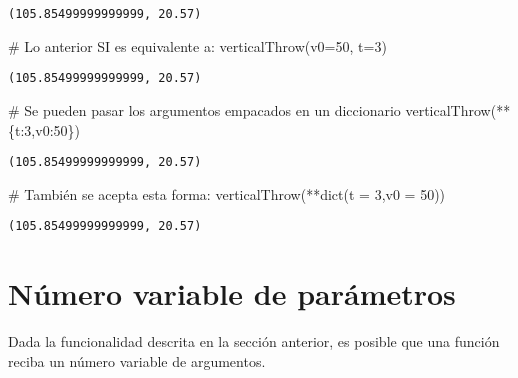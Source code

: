 \documentclass[
  letterpaper,
  DIV=11,
  numbers=noendperiod]{scrreprt}
\newenvironment{Shaded}{\begin{snugshade}}{\end{snugshade}}
\newcommand{\BuiltInTok}[1]{\textcolor[rgb]{0.00,0.23,0.31}{#1}}
\newcommand{\CommentTok}[1]{\textcolor[rgb]{0.37,0.37,0.37}{#1}}
\newcommand{\DecValTok}[1]{\textcolor[rgb]{0.68,0.00,0.00}{#1}}
\newcommand{\NormalTok}[1]{\textcolor[rgb]{0.00,0.23,0.31}{#1}}
\newcommand{\OperatorTok}[1]{\textcolor[rgb]{0.37,0.37,0.37}{#1}}
\newcommand{\StringTok}[1]{\textcolor[rgb]{0.13,0.47,0.30}{#1}}
\begin{document}
\begin{verbatim}
(105.85499999999999, 20.57)
\end{verbatim}

\begin{Shaded}
\begin{Highlighting}[]
\CommentTok{\# Lo anterior SI es equivalente a:}
\NormalTok{verticalThrow(v0}\OperatorTok{=}\DecValTok{50}\NormalTok{, t}\OperatorTok{=}\DecValTok{3}\NormalTok{)}
\end{Highlighting}
\end{Shaded}

\begin{verbatim}
(105.85499999999999, 20.57)
\end{verbatim}

\begin{Shaded}
\begin{Highlighting}[]
\CommentTok{\# Se pueden pasar los argumentos empacados en un diccionario}
\NormalTok{verticalThrow(}\OperatorTok{**}\NormalTok{\{}\StringTok{\textquotesingle{}t\textquotesingle{}}\NormalTok{:}\DecValTok{3}\NormalTok{,}\StringTok{\textquotesingle{}v0\textquotesingle{}}\NormalTok{:}\DecValTok{50}\NormalTok{\})}
\end{Highlighting}
\end{Shaded}

\begin{verbatim}
(105.85499999999999, 20.57)
\end{verbatim}

\begin{Shaded}
\begin{Highlighting}[]
\CommentTok{\# También se acepta esta forma:}
\NormalTok{verticalThrow(}\OperatorTok{**}\BuiltInTok{dict}\NormalTok{(t }\OperatorTok{=} \DecValTok{3}\NormalTok{,v0 }\OperatorTok{=} \DecValTok{50}\NormalTok{))}
\end{Highlighting}
\end{Shaded}

\begin{verbatim}
(105.85499999999999, 20.57)
\end{verbatim}


\chapter{Número variable de
parámetros}\label{nuxfamero-variable-de-paruxe1metros}

Dada la funcionalidad descrita en la sección anterior, es posible que
una función reciba un número variable de argumentos.
\end{document}

